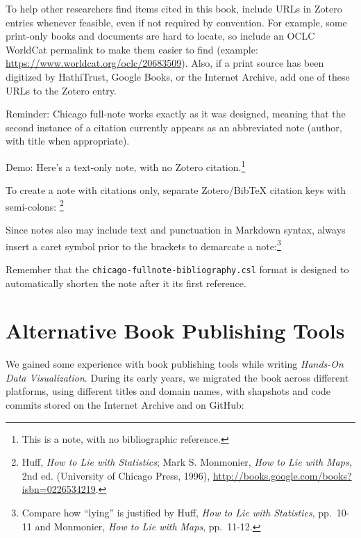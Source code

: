 \documentclass[
  english,
]{book}
\begin{document}
To help other researchers find items cited in this book, include URLs in Zotero entries whenever feasible, even if not required by convention. For example, some print-only books and documents are hard to locate, so include an OCLC WorldCat permalink to make them easier to find (example: \url{https://www.worldcat.org/oclc/20683509}). Also, if a print source has been digitized by HathiTrust, Google Books, or the Internet Archive, add one of these URLs to the Zotero entry.

Reminder: Chicago full-note works exactly as it was designed, meaning that the second instance of a citation currently appears as an abbreviated note (author, with title when appropriate).

Demo:
Here's a text-only note, with no Zotero citation.\footnote{This is a note, with no bibliographic reference.}

To create a note with citations only, separate Zotero/BibTeX citation keys with semi-colons: \footnote{Huff, \emph{How to {Lie} with {Statistics}}; Mark S. Monmonier, \emph{How to {Lie} with {Maps}}, 2nd ed. ({University of Chicago Press}, 1996), \url{http://books.google.com/books?isbn=0226534219}.}

Since notes also may include text and punctuation in Markdown syntax, always insert a caret symbol prior to the brackets to demarcate a note:\footnote{Compare how ``lying'' is justified by Huff, \emph{How to {Lie} with {Statistics}}, pp.~10-11 and Monmonier, \emph{How to {Lie} with {Maps}}, pp.~11-12.}

Remember that the \texttt{chicago-fullnote-bibliography.csl} format is designed to automatically shorten the note after it its first reference.

\hypertarget{alternative}{%
\section*{Alternative Book Publishing Tools}\label{alternative}}

We gained some experience with book publishing tools while writing \emph{Hands-On Data Visualization}. During its early years, we migrated the book across different platforms, using different titles and domain names, with shapshots and code commits stored on the Internet Archive and on GitHub:
\end{document}

